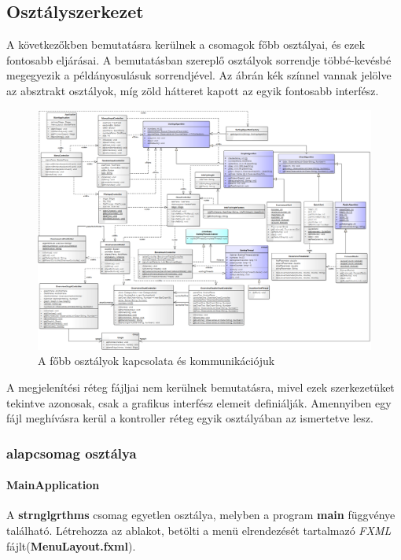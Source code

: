 \documentclass{elteikthesis}
\newcommand{\hiddenparagraph}[1]{
	\stepcounter{paragraph}
	\paragraph*{{#1}}
}
\begin{document}
\subsection{Osztályszerkezet}
A következőkben bemutatásra kerülnek a csomagok főbb osztályai, és ezek fontosabb eljárásai. A bemutatásban szereplő osztályok sorrendje többé-kevésbé megegyezik a példányosulásuk sorrendjével. Az ábrán kék színnel vannak jelölve az absztrakt osztályok, míg zöld hátteret kapott az egyik fontosabb interfész.\par
\begin{figure}[H]
	\centering
	\includegraphics[width=\textwidth]{pics/plan_class.png}
	\caption{A főbb osztályok kapcsolata és kommunikációjuk}
\end{figure}\par
A megjelenítési réteg fájljai nem kerülnek bemutatásra, mivel ezek szerkezetüket tekintve azonosak, csak a grafikus interfész elemeit definiálják. Amennyiben egy fájl meghívásra kerül a kontroller réteg egyik osztályában az ismertetve lesz.
\subsubsection{alapcsomag osztálya}
\hiddenparagraph{MainApplication}
A \textbf{strnglgrthms} csomag egyetlen osztálya, melyben a program \textbf{main} függvénye található. Létrehozza az ablakot, betölti a menü elrendezését tartalmazó \emph{FXML} fájlt(\textbf{MenuLayout.fxml}).
\end{document}
